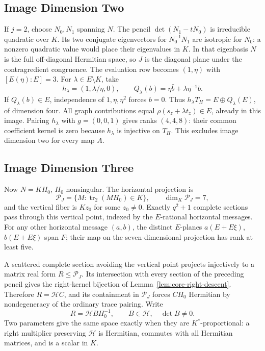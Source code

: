 \documentclass[12pt,letterpaper,onecolumn]{article}
\theoremstyle{definition}
\theoremstyle{remark}
\begin{document}
\subsection{Image Dimension Two}
If \(j=2\), choose \(N_0,N_1\) spanning \(N\).
The pencil \(\det(N_1-tN_0)\) is irreducible quadratic over \(K\). Its two conjugate eigenvectors for \(N_0^{-1}N_1\) are isotropic for \(N_0\): a nonzero quadratic value would place their eigenvalues in \(K\).
In that eigenbasis \(N\) is the full off-diagonal Hermitian space, so \(J\) is the diagonal plane under the contragredient congruence.
The evaluation row becomes \((1,\eta)\) with \([E(\eta):E]=3\).
For \(\lambda\in E\setminus K\), take
\[
h_\lambda=(1,\lambda/\eta,0),\qquad
Q_\lambda(b)=\eta\bar b+\lambda\eta^{-1}b.
\]
If \(Q_\lambda(b)\in E\), independence of \(1,\eta,\eta^2\) forces \(b=0\). Thus
\(h_\lambda T_H=E\oplus Q_\lambda(E)\), of dimension four.
All graph contributions equal \(\rho(s_z+\lambda t_z)\in E\), already in this image.
Pairing \(h_\lambda\) with \(g=(0,0,1)\) gives ranks \((4,4,8)\): their common coefficient kernel is zero because \(h_\lambda\) is injective on \(T_H\).
This excludes image dimension two for every map \(A\).

\subsection{Image Dimension Three}
Now \(N=KH_0\), \(H_0\) nonsingular. The horizontal projection is
\[
\mathcal P_J=\{M:\operatorname{tr}_2(MH_0)\in K\},\qquad \dim_K\mathcal P_J=7,
\]
and the vertical fiber is \(Kz_0\) for some \(z_0\ne0\).
Exactly \(q^2+1\) complete sections pass through this vertical point, indexed by the \(E\)-rational horizontal messages.
For any other horizontal message \((a,b)\), the distinct \(E\)-planes \(a(E+E\xi)\), \(b(E+E\xi)\) span \(F\); their map on the seven-dimensional projection has rank at least five.

A scattered complete section avoiding the vertical point projects injectively to a matrix real form \(R\le\mathcal P_J\). Its intersection with every section of the preceding pencil gives the right-kernel bijection of Lemma~\ref{lem:core-right-descent}.
Therefore \(R=\mathcal HC\), and its containment in \(\mathcal P_J\) forces \(CH_0\) Hermitian by nondegeneracy of the ordinary trace pairing. Write
\[
R=\mathcal H B H_0^{-1},\qquad B\in\mathcal H,\quad\det B\ne0.
\]
Two parameters give the same space exactly when they are \(K^*\)-proportional: a right multiplier preserving \(\mathcal H\) is Hermitian, commutes with all Hermitian matrices, and is a scalar in \(K\).
\end{document}

